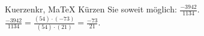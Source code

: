 \begin{MAufgabe}{Kuerzen}{kr, MaTeX}
K\"urzen Sie soweit m\"oglich: $\frac{-3942}{1134}$.\\ 
\ifLsg\MLoesung
\quad $\frac{-3942}{1134}=\frac{(54)\cdot(-73)}{(54)\cdot(21)}=\frac{-73}{21}$.\else\relax\fi
 \end{MAufgabe}
